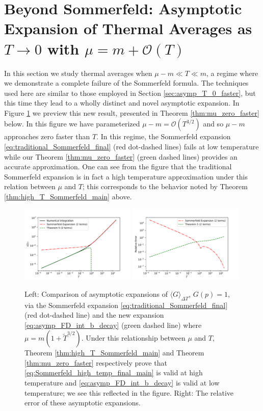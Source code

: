 \documentclass[sn-mathphys,Numbered]{sn-jnl}
\begin{document}
\section{Beyond Sommerfeld: Asymptotic Expansion of Thermal Averages as $T\to 0$ with $\mu=m+\mathcal{O}(T)$}\label{sec:asympt_Delta_mu_order_T}
In this section we study thermal averages when $\mu-m\ll T\ll m$, a regime where we demonstrate a complete failure of the Sommerfeld formula. The techniques used here are similar to those employed in Section \ref{sec:asymp_T_0_faster}, but this time they lead to a wholly distinct and novel asymptotic expansion.  In Figure \ref{fig:FD_avg_expansion_comparison_Sommerfeld} we preview this new result, presented in Theorem \ref{thm:mu_zero_faster} below.  In this figure we have parameterized $\mu-m=\mathcal{O}(T^{3/2})$ and so $\mu-m$ approaches zero faster than $T$.  In this regime, the Sommerfeld expansion \eqref{eq:traditional_Sommerfeld_final} (red dot-dashed lines) fails at low temperature while our Theorem \ref{thm:mu_zero_faster} (green dashed lines) provides an accurate approximation.  One can see from the figure that the traditional Sommerfeld expansion is in fact a high temperature approximation under this  relation between $\mu$ and $T$; this corresponds to the behavior noted by Theorem \ref{thm:high_T_Sommerfeld_main} above.
\begin{figure}[b]
\centering
\includegraphics[width=0.49\textwidth]{./plot/Sommerfeld_high_temp_comparison.pdf}
\includegraphics[width=0.49\textwidth]{./plot/Sommerfeld_high_temp_relative_error_comparison.pdf}
\caption{Left: Comparison of asymptotic expansions of $\langle G\rangle_{\Delta T}$, $G(p)=1$, via the Sommerfeld expansion \eqref{eq:traditional_Sommerfeld_final} (red dot-dashed line) and the new expansion  \eqref{eq:asymp_FD_int_b_decay}  (green dashed  line) where  $\mu=m(1+\widetilde{T}^{3/2})$.  Under this relationship between $\mu$ and $T$, Theorem \ref{thm:high_T_Sommerfeld_main} and Theorem \ref{thm:mu_zero_faster} respectively prove that \eqref{eq:Sommerfeld_high_temp_final_main} is valid at high temperature and \eqref{eq:asymp_FD_int_b_decay} is valid at low temperature; we see this reflected in the figure. Right: The relative error of these asymptotic expansions.  }\label{fig:FD_avg_expansion_comparison_Sommerfeld}
\end{figure}
\end{document}
